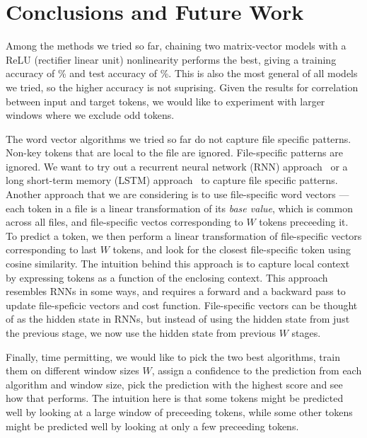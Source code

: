 \section{Conclusions and Future Work}
\label{sec:conclusions}

\noindent
Among the methods we tried so far, chaining two matrix-vector models with a
ReLU (rectifier linear unit) nonlinearity performs the best, giving
a training accuracy of \% and test accuracy of \%.
This is also the most general of all models we tried, so
the higher accuracy is not suprising. Given the results for correlation between
input and target tokens, we would like to experiment with larger windows
where we exclude odd tokens.

The word vector algorithms we tried so far do not capture file specific
patterns. Non-key tokens that are local to the file are ignored. File-specific
patterns are ignored. We want to try out a recurrent neural network (RNN)
approach~\cite{rnn} or a long short-term memory (LSTM) approach~\cite{lstm,
rnnlstm} to
capture file specific patterns. Another approach that we are considering is to
use file-specific word vectors --- each token in a file is a linear
transformation of its \emph{base value}, which is common across all files, and
file-specific vectos corresponding to $W$ tokens preceeding it.
To predict a token, we then perform a linear transformation of file-specific
vectors corresponding to last $W$ tokens, and look for the closest
file-specific token using cosine similarity. The intuition behind this approach
is to capture local context by expressing tokens as a function of the enclosing
context. This approach resembles RNNs in some ways, and requires a forward and
a backward pass to update file-speficic vectors and cost function.
File-specific vectors can be thought of as the hidden state in RNNs, but
instead of using the hidden state from just the previous stage, we now use the
hidden state from previous $W$ stages.

Finally, time permitting,
we would like to pick the two best algorithms, train them on different
window sizes $W$, assign a confidence to the prediction from each algorithm and
window size, pick the prediction with the highest score and see how that
performs. The intuition here is that some tokens might be predicted well by
looking at a large window of preceeding tokens, while some other tokens might
be predicted well by looking at only a few preceeding tokens.
